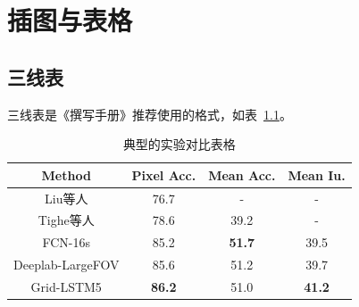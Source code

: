 \chapter{插图与表格}

\label{cha:tables-and-images}

\section{三线表}

三线表是《撰写手册》推荐使用的格式，如表~\ref{tab:siftflow}。

\begin{table}[h] %
    \centering
    \caption{典型的实验对比表格}
    \begin{tabular}{*{4}{c}}
        \toprule
        Method                                & Pixel Acc.    & Mean Acc.     & Mean Iu.      \\
        \midrule
        Liu等人\cite{liu2011sift}             & 76.7          & -             & -             \\
        Tighe等人\cite{tighe2013finding}      & 78.6          & 39.2          & -             \\
        FCN-16s\cite{long2015fully}           & 85.2          & \textbf{51.7} & 39.5          \\
        Deeplab-LargeFOV\cite{chen14semantic} & 85.6          & 51.2          & 39.7          \\
        \midrule
        Grid-LSTM5                            & \textbf{86.2} & 51.0          & \textbf{41.2} \\
        \bottomrule
    \end{tabular}
    \label{tab:siftflow}
\end{table}

